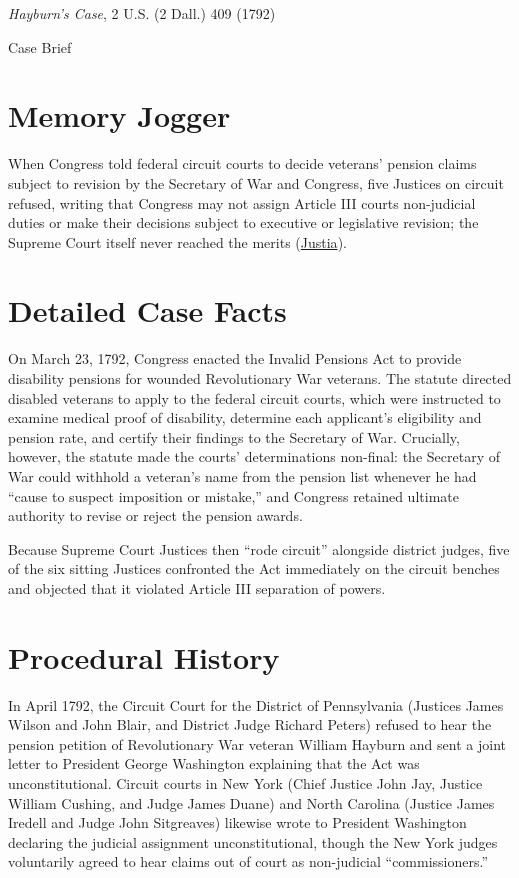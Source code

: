 \documentclass[12pt]{article}
\begin{document}
\begin{center}
{\LARGE \textit{Hayburn's Case}, 2 U.S. (2 Dall.) 409 (1792)\par}
\vspace{0.8em}
{\large Case Brief\par}
\end{center}
\vspace{1em}

\section{Memory Jogger}
When Congress told federal circuit courts to decide veterans' pension claims subject to revision by the Secretary of War and Congress, five Justices on circuit refused, writing that Congress may not assign Article III courts non-judicial duties or make their decisions subject to executive or legislative revision; the Supreme Court itself never reached the merits (\href{https://supreme.justia.com/cases/federal/us/2/409/}{Justia}).

\section{Detailed Case Facts}
On March 23, 1792, Congress enacted the Invalid Pensions Act to provide disability pensions for wounded Revolutionary War veterans. The statute directed disabled veterans to apply to the federal circuit courts, which were instructed to examine medical proof of disability, determine each applicant's eligibility and pension rate, and certify their findings to the Secretary of War. Crucially, however, the statute made the courts' determinations non-final: the Secretary of War could withhold a veteran's name from the pension list whenever he had ``cause to suspect imposition or mistake,'' and Congress retained ultimate authority to revise or reject the pension awards.

Because Supreme Court Justices then ``rode circuit'' alongside district judges, five of the six sitting Justices confronted the Act immediately on the circuit benches and objected that it violated Article III separation of powers.

\section{Procedural History}
In April 1792, the Circuit Court for the District of Pennsylvania (Justices James Wilson and John Blair, and District Judge Richard Peters) refused to hear the pension petition of Revolutionary War veteran William Hayburn and sent a joint letter to President George Washington explaining that the Act was unconstitutional. Circuit courts in New York (Chief Justice John Jay, Justice William Cushing, and Judge James Duane) and North Carolina (Justice James Iredell and Judge John Sitgreaves) likewise wrote to President Washington declaring the judicial assignment unconstitutional, though the New York judges voluntarily agreed to hear claims out of court as non-judicial ``commissioners.''
\end{document}
